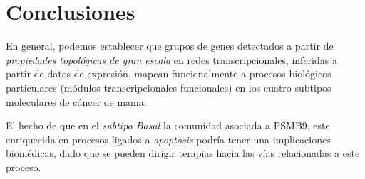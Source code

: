 \documentclass[a4paper,12pt]{article}
\begin{document}
\section{Conclusiones}

En general, podemos establecer que grupos de genes detectados a partir de \emph{propiedades topológicas de gran escala} en redes transcripcionales, inferidas a partir de datos de expresión, mapean funcionalmente a procesos biológicos particulares (módulos transcripcionales funcionales) en los cuatro subtipos moleculares de cáncer de mama.

El hecho de que en el \emph{subtipo Basal} la comunidad asociada a PSMB9, este enriquecida en procesos ligados a \emph{apoptosis} podría tener una implicaciones biomédicas, dado que se pueden dirigir terapias hacia las vías relacionadas a este proceso.
\end{document}
